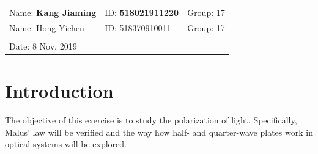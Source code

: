 \documentclass{article}
\begin{document}
\vspace*{0.25cm}

\noindent\hrulefill

\thispagestyle{empty}

\begin{center}
\begin{large}
\end{large}

\hrulefill

\vspace*{5cm}
\begin{Large}
\end{Large}

\vspace{2em}

\begin{large}
\end{large}
\end{center}
\vfill

\begin{table}[h!]
\flushleft
\begin{tabular}{lll}
Name: \textbf{Kang Jiaming} \hspace*{2em}&
ID: \textbf{518021911220} \hspace*{2em}
& Group: 17\\
Name: Hong Yichen \hspace*{2em}&
ID: 518370910011\hspace*{2em}
& Group: 17\\
\\

Date: 8 Nov. 2019

\end{tabular}
\end{table}

\hfill
\newpage
\tableofcontents
\setcounter{page}{0}
\thispagestyle{empty}
\newpage

\section{Introduction\label{Ob}}

The objective of this exercise is to study the polarization of light. Specifically, Malus' law will be verified and the way how half- and quarter-wave plates work in optical systems will be explored.
\end{document}
